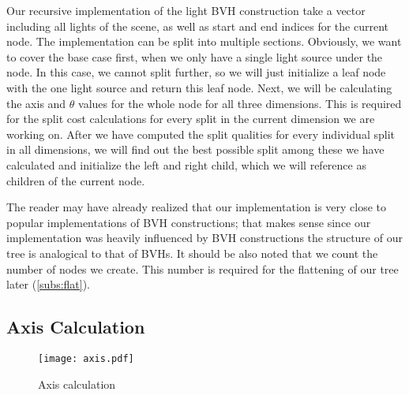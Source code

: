 Our recursive implementation of the light BVH construction take a vector including all lights of the scene, as well as start and end indices for the current node. The implementation can be split into multiple sections. Obviously, we want to cover the base case first, when we only have a single light source under the node. In this case, we cannot split further, so we will just initialize a leaf node with the one light source and return this leaf node. Next, we will be calculating the axis and $\theta$ values for the whole node for all three dimensions. This is required for the split cost calculations for every split in the current dimension we are working on. After we have computed the split qualities for every individual split in all dimensions, we will find out the best possible split among these we have calculated and initialize the left and right child, which we will reference as children of the current node.

The reader may have already realized that our implementation is very close to popular implementations of BVH constructions; that makes sense since our implementation was heavily influenced by BVH constructions the structure of our tree is analogical to that of BVHs. It should be also noted that we count the number of nodes we create. This number is required for the flattening of our tree later (\ref{subs:flat}).

\subsection{Axis Calculation}
\label{subs:axis}

\begin{figure}
	\begin{center}
		\texttt{[image: axis.pdf]}
		\caption{Axis calculation}
		\label{fig:axis}
	\end{center}
\end{figure}

